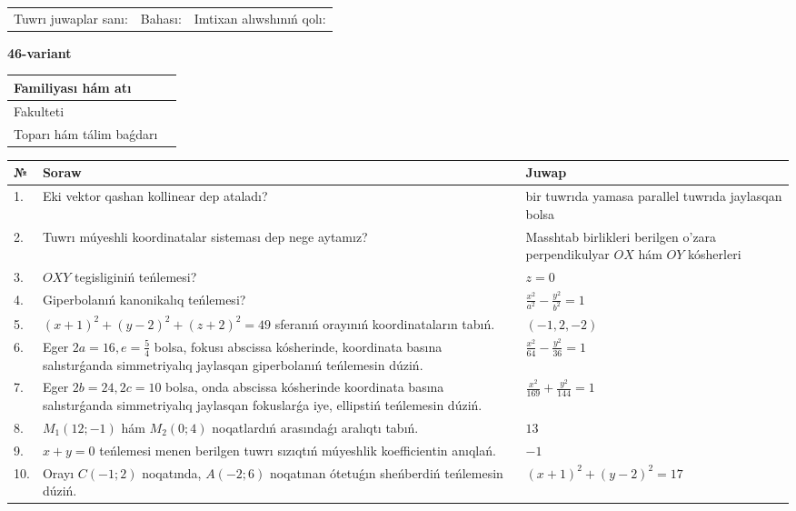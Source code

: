 \documentclass{article}
\begin{document}
\vspace{1cm}

\begin{tabular}{lll}
Tuwrı juwaplar sanı: \underline{\hspace{1.5cm}} & 
Bahası: \underline{\hspace{1.5cm}} & 
Imtixan alıwshınıń qolı: \underline{\hspace{2cm}} \\
\end{tabular}

\egroup

\newpage


\textbf{46-variant}\\

\bgroup
\def\arraystretch{1.6} %

\begin{tabular}{|m{5.7cm}|m{9.5cm}|}
\hline
Familiyası hám atı & \\
\hline
Fakulteti  & \\
\hline
Toparı hám tálim baǵdarı  & \\
\hline
\end{tabular}

\vspace{1cm}

\begin{tabular}{|m{0.7cm}|m{10cm}|m{4cm}|}
\hline
№ & Soraw & Juwap \\
\hline
1. & Eki vektor qashan kollinear dep ataladı? & bir tuwrıda yamasa parallel tuwrıda jaylasqan bolsa \\
\hline
2. & Tuwrı múyeshli koordinatalar sisteması dep nege aytamız? & Masshtab birlikleri berilgen o'zara perpendikulyar $OX$ hám $OY$ kósherleri \\
\hline
3. & $OXY$ tegisliginiń teńlemesi? & $z=0$ \\
\hline
4. & Giperbolanıń kanonikalıq teńlemesi? & $\frac{x^2}{a^2}-\frac{y^2}{b^2}=1$ \\
\hline
5. & $(x+1)^{2}+(y-2) ^{2}+(z+2) ^{2}=49$ sferanıń orayınıń koordinataların tabıń. & $(-1,2,-2)$ \\
\hline
6. & Eger $2a=16, e=\frac{5}{4}$ bolsa, fokusı abscissa kósherinde, koordinata basına salıstırǵanda simmetriyalıq jaylasqan giperbolanıń teńlemesin dúziń. & $\frac{x^{2}}{64}-\frac{y^{2}}{36}=1$ \\
\hline
7. & Eger $2b=24, 2 c=10$ bolsa, onda abscissa kósherinde koordinata basına salıstırǵanda simmetriyalıq jaylasqan fokuslarǵa iye, ellipstiń teńlemesin dúziń. & $\frac{x^{2}}{169}+\frac{y^{2}}{144}=1$ \\
\hline
8. & $M_{1} (12;-1)$ hám $M_{2} (0;4)$ noqatlardıń arasındaǵı aralıqtı tabıń. & $13$ \\
\hline
9. & $x+y=0$ teńlemesi menen berilgen tuwrı sızıqtıń múyeshlik koefficientin anıqlań. & $- 1$ \\
\hline
10. & Orayı $C (-1;2)$ noqatında, $A (-2;6 )$ noqatınan ótetuǵın sheńberdiń teńlemesin dúziń. & $(x+1)^{2}+(y-2)^{2}=17$ \\
\hline
\end{tabular}
\end{document}
